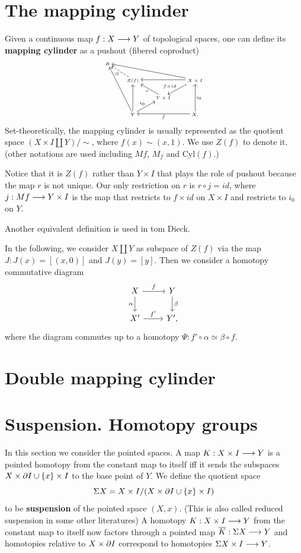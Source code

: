 \documentclass[11pt]{book} %
\begin{document}
\section{The mapping cylinder}
\begin{definition}
Given a continuous map $f:X\longrightarrow Y$ of topological spaces, one can define its \textbf{mapping cylinder} as a pushout (fibered coproduct) 
\[
\tiny
\begin{tikzcd}
B &  &  &  \\
 & Z(f) \arrow[lu, "\exists!", dashed] &  & X\times I \arrow[ll] \arrow[ld, "f\times id"'] \arrow[lllu] \\
 &  & Y\times I \arrow[lu, "r"] &  \\
 & Y \arrow[uu] \arrow[ru, "i_0"] \arrow[luuu] &  & X \arrow[ll, "f"] \arrow[uu, "i_0"'],
\end{tikzcd}
\]
Set-theoretically, the mapping cylinder is usually represented as the quotient space $(X\times I \coprod Y)/\sim$, where $f(x)\sim (x,1)$.
We use $Z(f)$ to denote it. (other notations are used including $Mf$, $M_f$ and $\text{Cyl}(f)$.)
\end{definition}
Notice that it is $Z(f)$ rather than $Y\times I$ that plays the role of pushout because the map $r$ is not unique. Our only restriction on $r$ is $r\circ j=id$, where $j: Mf\longrightarrow Y\times I$ is the map that restricts to $f\times id$ on $X\times I$ and restricts to $i_0$ on $Y$.
\begin{remark}
Another equivalent definition is used in tom Dieck.
\end{remark}

In the following, we consider $X\coprod Y$ as subspace of $Z(f)$ via the map $J:J(x)=[(x,0)]$ and $J(y)=[y]$. Then we consider a homotopy commutative diagram
\[
\begin{tikzcd}
X \arrow[r, "f"] \arrow[d, "\alpha"'] & Y \arrow[d, "\beta"] \\
X' \arrow[r, "f'"] & Y',
\end{tikzcd}
\]
where the diagram commutes up to a homotopy $\Psi: f'\circ \alpha\simeq \beta \circ f$.
\section{Double mapping cylinder}
\section{Suspension. Homotopy groups}
In this section we consider the pointed spaces. A map $K: X\times I\longrightarrow Y$ is a pointed homotopy from the constant map to itself iff it sends the subspaces $X\times {\partial} I\cup \{x\}\times I$ to the base point of $Y$. We define the quotient space 
$$
\Sigma X=X\times I/(X\times {\partial} I\cup \{x\}\times I)
$$
to be \textbf{suspension} of the pointed space $(X,x)$. (This is also called reduced suspension in some other literatures) A homotopy $K: X\times I\longrightarrow Y$ from the constant map to itself now factors through a pointed map $\overline{K}:\Sigma X\longrightarrow Y$ and homotopies relative to $X\times {\partial} I$ correspond to homotopies $\Sigma X\times I\longrightarrow Y$. 
\end{document}
